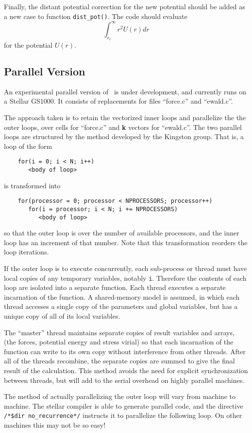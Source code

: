 Finally, the distant potential correction for the new potential should
be added as a new case to function \verb'dist_pot()'. The code should evaluate
\[
\int^{\infty}_{r_c} r^2 U(r) dr
\]
for the potential $U(r)$.
\subsection{Parallel Version}
An experimental parallel version of \moldy\  is under development, and
currently runs on a Stellar GS1000.   It consists of replacements for
files ``force.c'' and ``ewald.c''. 

The approach taken is to retain the vectorized inner loops and
parallelize the the outer loops, over cells for ``force.c'' and {\bf
k} vectors for ``ewald.c''.  The two parallel loops are structured by
the method developed by the Kingston group\cite{clementi:8?}. That is, a loop
of the form
\begin{verbatim}
	for(i = 0; i < N; i++)
	   <body of loop>
\end{verbatim}
is transformed into
\begin{verbatim}
	for(processor = 0; processor < NPROCESSORS; processor++)
	   for(i = processor; i < N; i += NPROCESSORS)
	      <body of loop>
\end{verbatim}
so that the outer loop is over the number of available processors,
and the inner loop has an increment of that number.  Note that this
transformation reorders the loop iterations.

If the outer loop is to execute concurrently, each sub-process or
thread must have local copies of any temporary variables, notably
\verb'i'.  Therefore the contents of each loop are isolated into a
separate function. Each thread executes a separate incarnation
of the function.  A shared-memory model is assumed, in which each
thread accesses a single copy of the parameters and global
variables, but has a unique copy of all of its local variables.

The ``master'' thread maintains separate copies of result variables
and arrays, (\ie the forces, potential energy and stress virial) so
that each incarnation of the function can write to its own copy
without interference from other threads.  After all of the threads
recombine, the separate copies are summed to give the final result of
the calculation.  This method avoids the need for explicit
synchronization between threads, but will add to the serial overhead
on highly parallel machines.

The method of actually parallelizing the outer loop will vary from
machine to machine. The stellar compiler is able to generate parallel
code, and the directive \verb'/*$dir'~\verb'no_recurrence*/' instructs
it to parallelize the following loop.  On other machines this may not
be so easy!
\appendix
